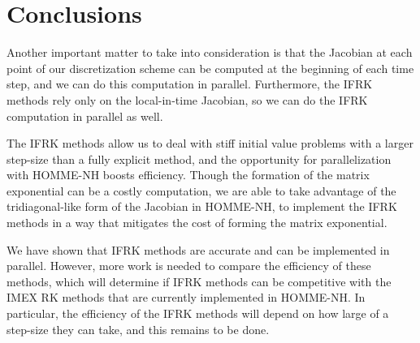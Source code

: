 \documentclass{csri19}
\begin{document}
\section{Conclusions}
Another important matter to take into consideration is that the Jacobian 
at each point of our discretization scheme can be computed at the 
beginning of each time step, and we can do this computation in parallel. 
Furthermore, the IFRK methods rely only on the local-in-time Jacobian, so 
we can do the IFRK computation in parallel as well.

The IFRK methods allow us to deal with stiff initial value problems with a 
larger step-size than a fully explicit method, and the opportunity for 
parallelization with HOMME-NH boosts efficiency. Though the formation of 
the matrix exponential can be a costly computation, we are able to take 
advantage of the tridiagonal-like form of the Jacobian in HOMME-NH, to 
implement the IFRK methods in a way that mitigates the cost of forming the 
matrix exponential.

We have shown that IFRK methods are accurate and can be implemented in 
parallel. However, more work is needed to compare the efficiency of these 
methods, which will determine if IFRK methods can be competitive with 
the IMEX RK methods that are currently implemented in HOMME-NH. In 
particular, the efficiency of the IFRK methods will depend on how large of 
a step-size they can take, and this remains to be done.

\newpage



%
\end{document}
